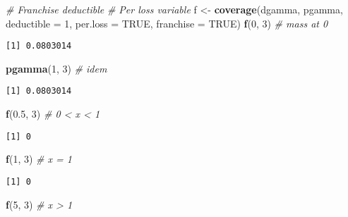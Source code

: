 \documentclass[]{book}
\newenvironment{Shaded}{\begin{snugshade}}{\end{snugshade}}
\newcommand{\KeywordTok}[1]{\textcolor[rgb]{0.13,0.29,0.53}{\textbf{#1}}}
\newcommand{\DataTypeTok}[1]{\textcolor[rgb]{0.13,0.29,0.53}{#1}}
\newcommand{\DecValTok}[1]{\textcolor[rgb]{0.00,0.00,0.81}{#1}}
\newcommand{\FloatTok}[1]{\textcolor[rgb]{0.00,0.00,0.81}{#1}}
\newcommand{\StringTok}[1]{\textcolor[rgb]{0.31,0.60,0.02}{#1}}
\newcommand{\CommentTok}[1]{\textcolor[rgb]{0.56,0.35,0.01}{\textit{#1}}}
\newcommand{\OtherTok}[1]{\textcolor[rgb]{0.56,0.35,0.01}{#1}}
\newcommand{\NormalTok}[1]{#1}
\theoremstyle{definition}
\theoremstyle{definition}
\theoremstyle{definition}
\theoremstyle{remark}
\begin{document}
\begin{Shaded}
\begin{Highlighting}[]
\CommentTok{# Franchise deductible }
\CommentTok{# Per loss variable}
\NormalTok{f <-}\StringTok{ }\KeywordTok{coverage}\NormalTok{(dgamma, pgamma, }\DataTypeTok{deductible =} \DecValTok{1}\NormalTok{, }\DataTypeTok{per.loss =} \OtherTok{TRUE}\NormalTok{, }\DataTypeTok{franchise =} \OtherTok{TRUE}\NormalTok{)}
\KeywordTok{f}\NormalTok{(}\DecValTok{0}\NormalTok{, }\DecValTok{3}\NormalTok{)  }\CommentTok{# mass at 0}
\end{Highlighting}
\end{Shaded}

\begin{verbatim}
[1] 0.0803014
\end{verbatim}

\begin{Shaded}
\begin{Highlighting}[]
\KeywordTok{pgamma}\NormalTok{(}\DecValTok{1}\NormalTok{, }\DecValTok{3}\NormalTok{)  }\CommentTok{# idem}
\end{Highlighting}
\end{Shaded}

\begin{verbatim}
[1] 0.0803014
\end{verbatim}

\begin{Shaded}
\begin{Highlighting}[]
\KeywordTok{f}\NormalTok{(}\FloatTok{0.5}\NormalTok{, }\DecValTok{3}\NormalTok{)  }\CommentTok{# 0 < x < 1}
\end{Highlighting}
\end{Shaded}

\begin{verbatim}
[1] 0
\end{verbatim}

\begin{Shaded}
\begin{Highlighting}[]
\KeywordTok{f}\NormalTok{(}\DecValTok{1}\NormalTok{, }\DecValTok{3}\NormalTok{)  }\CommentTok{# x = 1}
\end{Highlighting}
\end{Shaded}

\begin{verbatim}
[1] 0
\end{verbatim}

\begin{Shaded}
\begin{Highlighting}[]
\KeywordTok{f}\NormalTok{(}\DecValTok{5}\NormalTok{, }\DecValTok{3}\NormalTok{)  }\CommentTok{# x > 1}
\end{Highlighting}
\end{Shaded}
\end{document}
